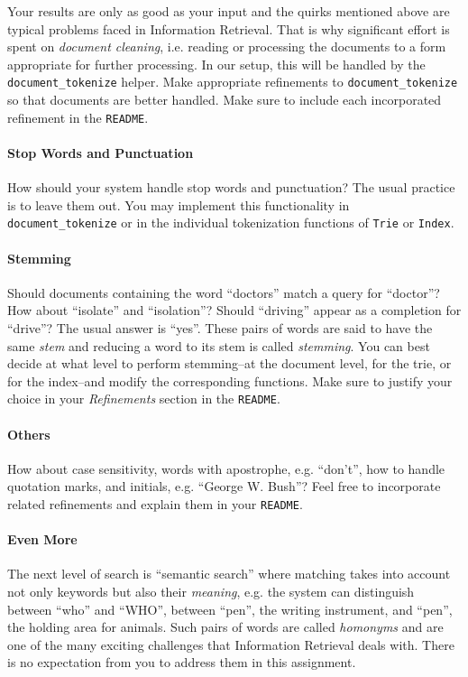 \documentclass[addpoints]{exam}
\begin{document}
Your results are only as good as your input and the quirks mentioned above are typical problems faced in Information Retrieval. That is why significant effort is spent on \textit{document cleaning}, i.e. reading or processing the documents to a form appropriate for further processing. In our setup, this will be handled by the \texttt{document\_tokenize} helper. Make appropriate refinements to \texttt{document\_tokenize} so that documents are better handled. Make sure to include each incorporated refinement in the \texttt{README}. 

\paragraph{Stop Words and Punctuation} How should your system handle stop words and punctuation? The usual practice is to leave them out. You may implement this functionality in \texttt{document\_tokenize} or in the individual tokenization functions of \texttt{Trie} or \texttt{Index}.

\paragraph{Stemming} Should documents containing the word ``doctors'' match a query for ``doctor''? How about ``isolate'' and ``isolation''? Should ``driving'' appear as a completion for ``drive''? The usual answer is ``yes''. These pairs of words are said to have the same \textit{stem} and reducing a word to its stem is called \textit{stemming}. You can best decide at what level to perform stemming--at the document level, for the trie, or for the index--and modify the corresponding functions. Make sure to justify your choice in your \textit{Refinements} section in the \texttt{README}.

\paragraph{Others} How about case sensitivity, words with apostrophe, e.g. ``don't'', how to handle quotation marks, and initials, e.g. ``George W. Bush''? Feel free to incorporate related refinements and explain them in your \texttt{README}.

\paragraph{Even More} The next level of search is ``semantic search'' where matching takes into account not only keywords but also their \textit{meaning}, e.g. the system can distinguish between ``who'' and ``WHO'', between ``pen'', the writing instrument, and ``pen'', the holding area for animals. Such pairs of words are called \textit{homonyms} and are one of the many exciting challenges that Information Retrieval deals with. There is no expectation from you to address them in this assignment.
\end{document}
